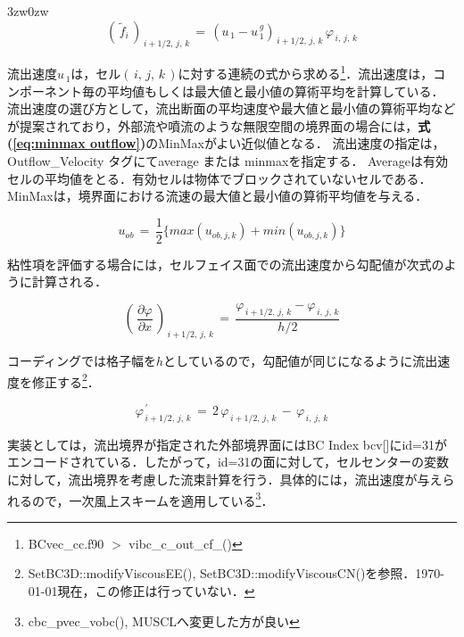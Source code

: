 \begin{indentation}{3zw}{0zw}
\begin{equation}
{\left(\, \tilde{f}_i \,\right)}_{\,i+1/2,\,j,\,k} \,=\, {\left( u_{\,1}-u_{\,1}^{\,g} \right)}_{\,i+1/2,\,j,\,k} \,\varphi_{\,i,\,j,\,k}
\label{eq:outflow flux}
\end{equation}

\noindent 流出速度$u_{\,1}$は，セル$(\,i,\,j,\,k\,)$に対する連続の式から求める\footnote{BCvec\_cc.f90 $>$ vibc\_c\_out\_cf\_()}．流出速度は，コンポーネント毎の平均値もしくは最大値と最小値の算術平均を計算している．
流出速度の選び方として，流出断面の平均速度や最大値と最小値の算術平均などが提案されており，外部流や噴流のような無限空間の境界面の場合には，\textbf{式(\ref{eq:minmax outflow})}のMinMaxがよい近似値となる．
流出速度の指定は，Outflow\_Velocity タグにてaverage または minmaxを指定する．
Averageは有効セルの平均値をとる．有効セルは物体でブロックされていないセルである．
MinMaxは，境界面における流速の最大値と最小値の算術平均値を与える．

\begin{equation}
u_{ob} \,=\, \frac{1}{2} \{ max(u_{ob,j,k}) + min(u_{ob,j,k}) \}
\label{eq:minmax outflow}
\end{equation}

粘性項を評価する場合には，セルフェイス面での流出速度から勾配値が次式のように計算される．

\begin{equation}
{\left(\, \frac{\partial \varphi}{\partial x} \,\right)}_{\,i+1/2,\,j,\,k} \,=\, \frac{\varphi_{\,i+1/2,\,j,\,k}-\varphi_{\,i,\,j,\,k}}{h/2}
\label{eq:outflow grad1}
\end{equation}

\noindent コーディングでは格子幅を$h$としているので，勾配値が同じになるように流出速度を修正する\footnote{SetBC3D::modifyViscousEE(), SetBC3D::modifyViscousCN()を参照．\today 現在，この修正は行っていない．}．

\begin{equation}
\varphi_{\,i+1/2,\,j,\,k}^{\,\prime} \,=\, 2\, \varphi_{\,i+1/2,\,j,\,k} \,-\, \varphi_{\,i,\,j,\,k}
\label{eq:outflow grad2}
\end{equation}

\vspace{2mm}

実装としては，流出境界が指定された外部境界面にはBC Index bcv[]にid=31がエンコードされている．したがって，id=31の面に対して，セルセンターの変数に対して，流出境界を考慮した流束計算を行う．具体的には，流出速度が与えられるので，一次風上スキームを適用している\footnote{cbc\_pvec\_vobc(), MUSCLへ変更した方が良い}．



\end{indentation}
